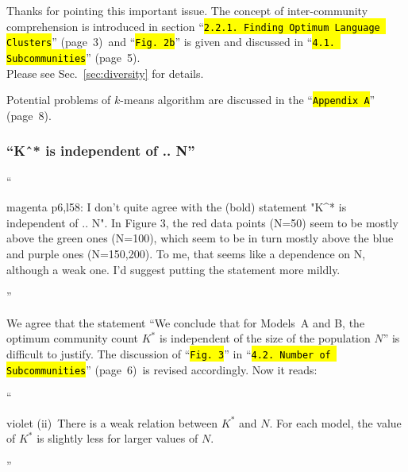 \documentclass[10.5pt]{amsart}
\newcommand{\refsec}[1]{Sec.~\ref{#1}}
\newcommand{\hbColorReviewer}{magenta}
\newcommand{\hbColorManuscript}{violet}
\newenvironment{hbReviewer}
	{\list{}{\leftmargin=2cm\rightmargin=1cm}\item[]``\begin{footnotesize}
	\begin{color}{\hbColorReviewer}}	
	{\end{color}\end{footnotesize}''\endlist}
\newcommand{\hbMRef}[1]{``\texttt{{\color{\hbColorManuscript}\hl{#1}}}''}
\newcommand{\hbMRefP}[2]{``\texttt{{\color{\hbColorManuscript}\hl{#1}}}''  (page~#2)}
\newenvironment{hbChanged}
	{\list{}{\leftmargin=1cm\rightmargin=1.5cm}\item[]``\begin{small}
	\begin{color}{\hbColorManuscript}}	
	{\end{color}\end{small}''\endlist}
\newcommand{\hbMreffig}[1]{\hbMRef{Fig.~#1}}
\newcommand{\hbMOptimumLanguageClusters}{\hbMRefP{2.2.1. Finding Optimum Language Clusters}{3}}
\newcommand{\hbMSubcommunities}{\hbMRefP{4.1. Subcommunities}{5}}
\newcommand{\hbMNumberOfSubcommunities}{\hbMRefP{4.2. Number of Subcommunities}{6}}
\newcommand{\hbMFutureWork}{\hbMRefP{4.3. Future Work}{7}}
\newcommand{\hbMAppendix}{\hbMRefP{Appendix A}{8}}
\newcommand{\hbOpt}[1]{{#1}^*}
\newcommand{\hbMAB}{Models~A and B}
\begin{document}
Thanks for pointing this important issue.
%
%
The concept of inter-community comprehension is introduced in
section \hbMOptimumLanguageClusters\ and 
\hbMreffig{2b} is given and  discussed in \hbMSubcommunities.\\
Please see \refsec{sec:diversity} for details.

Potential problems of $k$-means algorithm are discussed in the \hbMAppendix.






\subsubsection{``Kˆ* is independent of .. N''}
\begin{hbReviewer}
	p6,l58:
	I don't quite agree with the (bold) statement  "K\^{}* is independent of .. N".
	In Figure 3, the red data points (N=50) seem to be mostly above the green ones (N=100),
	which seem to be in turn mostly above the blue and purple ones (N=150,200).
	To me, that seems like a dependence on N, although a weak one.
	I'd suggest putting the statement more mildly.
\end{hbReviewer}



We agree that the statement
``We conclude that for \hbMAB,
the optimum community count $\hbOpt{K}$ is 
independent of the size of the population $N$'' 
is difficult to justify. 
The discussion of \hbMreffig{3} in \hbMNumberOfSubcommunities\ is revised  accordingly.
Now it reads:
\begin{hbChanged}
	(ii)~There is a weak relation between $K^{*}$ and $N$.
	For each model, 
	the value of $K^{*}$ is slightly less for larger values of $N$.
\end{hbChanged}
\end{document}

